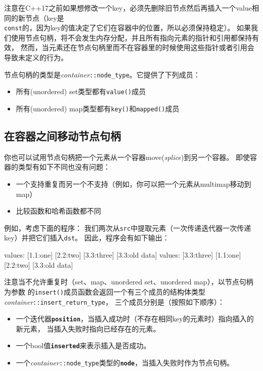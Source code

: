 注意在C++17之前如果想修改一个key，必须先删除旧节点然后再插入一个value相同的新节点（key是\\
\texttt{const}的，因为key的值决定了它们在容器中的位置，所以必须保持稳定）。
如果我们使用节点句柄，将不会发生内存分配，并且所有指向元素的指针和引用都保持有效，
然而，当元素还在节点句柄里而不在容器里的时候使用这些指针或者引用会导致未定义的行为。

节点句柄的类型是\emph{container}\texttt{::node\_type}。它提供了下列成员：
\begin{itemize}
    \item 所有(unordered) set类型都有\texttt{value()}成员
    \item 所有(unordered) map类型都有\texttt{key()}和\texttt{mapped()}成员
\end{itemize}

\subsection{在容器之间移动节点句柄}
你也可以试用节点句柄把一个元素从一个容器move(\emph{splice})到另一个容器。
即使容器的类型有如下不同也没有问题：
\begin{itemize}
    \item 一个支持重复而另一个不支持（例如，你可以把一个元素从multimap移动到map）
    \item 比较函数和哈希函数都不同
\end{itemize}
例如，考虑下面的程序：
我们两次从\texttt{src}中提取元素（一次传递迭代器一次传递key）并把它们插入\texttt{dst}。
因此，程序会有如下输出：
\begin{blacklisting}
    values:
      [1.1:one]  [2.2:two]  [3.3:three]
      [3.3:old data]
    values:
      [3.3:three]
      [1.1:one]  [2.2:two]  [3.3:old data]
\end{blacklisting}
注意当不允许重复时（set、map、unordered set、unordered map），以节点句柄为参数
的\texttt{insert()}成员函数会返回一个有三个成员的结构体类型\emph{container}\texttt{::insert\_return\_type}，
三个成员分别是（按照如下顺序）：\label{insert节点句柄}
\begin{itemize}
    \item 一个迭代器\textbf{\texttt{position}}，当插入成功时（不存在相同key的元素时）指向插入的新元素，
    当插入失败时指向已经存在的元素。
    \item 一个bool值\textbf{\texttt{inserted}}来表示插入是否成功。
    \item 一个\emph{container}\texttt{::node\_type}类型的\textbf{\texttt{node}}，当插入失败时作为节点句柄。
\end{itemize}

